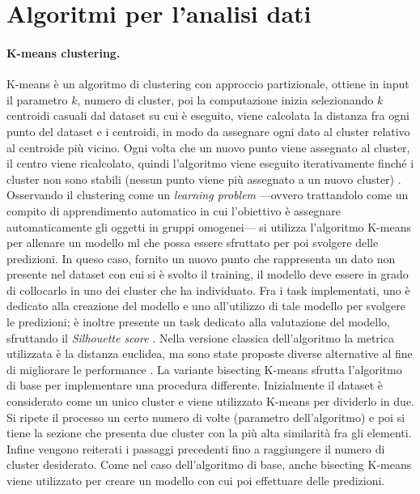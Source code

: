 \documentclass[12pt,a4paper,fleqn,titlepage]{report}
\begin{document}
    \section{Algoritmi per l'analisi dati}
        \paragraph{K-means clustering.}
        K-means è un algoritmo di clustering con approccio partizionale, ottiene in input il parametro $k$, numero di cluster, poi la computazione inizia selezionando $k$ centroidi casuali dal dataset su cui è eseguito, viene calcolata la distanza fra ogni punto del dataset e i centroidi, in modo da assegnare ogni dato al cluster relativo al centroide più vicino. Ogni volta che un nuovo punto viene assegnato al cluster, il centro viene ricalcolato, quindi l'algoritmo viene eseguito iterativamente finché i cluster non sono stabili (nessun punto viene più assegnato a un nuovo cluster) \cite{ikotun:2023}.
        Osservando il clustering come un \emph{learning problem} —ovvero trattandolo come un compito di apprendimento automatico in cui l'obiettivo è assegnare automaticamente gli oggetti in gruppi omogenei— si utilizza l'algoritmo K-means per allenare un modello \gls{ml} che possa essere sfruttato per poi svolgere delle predizioni. In queso caso, fornito un nuovo punto che rappresenta un dato non presente nel dataset con cui si è svolto il training, il modello deve essere in grado di collocarlo in uno dei cluster che ha individuato. Fra i task implementati, uno è dedicato alla creazione del modello e uno all'utilizzo di tale modello per svolgere le predizioni; è inoltre presente un task dedicato alla valutazione del modello, sfruttando il \emph{Silhouette score} \cite{shahapure:2020}.
        Nella versione classica dell'algoritmo la metrica utilizzata è la distanza euclidea, ma sono state proposte diverse alternative al fine di migliorare le performance \cite{chen:2021, chen:2021a, shen:2017}.
        La variante bisecting K-means \cite{steinbach:2000} sfrutta l'algoritmo di base per implementare una procedura differente. Inizialmente il dataset è considerato come un unico cluster e viene utilizzato K-means per dividerlo in due. Si ripete il processo un certo numero di volte (parametro dell'algoritmo) e poi si tiene la sezione che presenta due cluster con la più alta similarità fra gli elementi. Infine vengono reiterati i passaggi precedenti fino a raggiungere il numero di cluster desiderato. Come nel caso dell'algoritmo di base, anche bisecting K-means viene utilizzato per creare un modello con cui poi effettuare delle predizioni.
\end{document}
